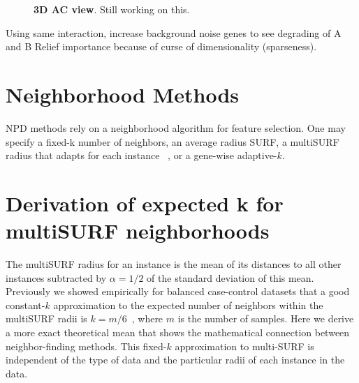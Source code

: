 \documentclass[10pt,letterpaper]{article}\usepackage[]{graphicx}\usepackage[]{color}
\begin{document}
\begin{figure}[ht!]
\begin{minipage}[c]{0.4\textheight}
\centering
\end{minipage} \hspace{-0.4cm}
\begin{minipage}[c]{0.5\textwidth}
\centering
\caption{{\bf 3D AC view}. Still working on this. }\label{fig:3d_d}
\end{minipage}
\end{figure}  
Using same interaction, increase background noise genes to see degrading of A and B Relief importance because of curse of dimensionality (sparseness). 

\section{Neighborhood Methods}
NPD methods rely on a neighborhood algorithm for feature selection. One may specify a fixed-k number of neighbors, an average radius SURF, a multiSURF radius that adapts for each instance ~\cite{urbanowicz17}, or a gene-wise adaptive-$k$. 

\section{Derivation of expected k for multiSURF neighborhoods}
The multiSURF radius for an instance is the mean of its distances to all other instances subtracted by $\alpha=1/2$ of the standard deviation of this mean. Previously we showed empirically for balanced case-control datasets that a good constant-$k$ approximation to the expected number of neighbors within the multiSURF radii is $k=m/6$~\cite{stir}, where $m$ is the number of samples. Here we derive a more exact theoretical mean that shows the mathematical connection between neighbor-finding methods. This fixed-$k$ approximation to multi-SURF is independent of the type of data and the particular radii of each instance in the data.
%
\end{document}
